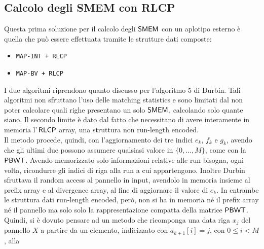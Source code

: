 \subsection{Calcolo degli SMEM con RLCP}
Questa prima soluzione per il calcolo degli $\mbox{\rm {\sf SMEM}}$ con un aplotipo esterno è
quella che può essere effettuata tramite le strutture dati composte:
\begin{itemize}
  \item \texttt{MAP-INT + RLCP}
  \item \texttt{MAP-BV + RLCP}
\end{itemize}
I due algoritmi riprendono  quanto discusso per l'algoritmo 5
di Durbin. Tali algoritmi non sfruttano l'uso delle matching statistics e sono
limitati dal non 
poter calcolare quali righe presentano un solo $\mbox{\rm {\sf SMEM}}$, calcolando solo quante
siano. Il secondo limite è dato dal fatto che necessitano di avere interamente
in memoria l'$\,\mbox{\rm {\sf RLCP}}$ array, una
struttura non run-length encoded.\\
Il metodo procede, quindi, con l'aggiornamento dei tre indici $e_k$, $f_k$ e
$g_k$, avendo che gli ultimi due possono assumere qualsiasi valore in
$\{0,\ldots, M\}$,
come con la $\mbox{\rm {\sf PBWT}}$. Avendo memorizzato solo informazioni
relative alle run bisogna, ogni volta, ricondurre gli indici di riga alla
run a cui appartengono.
Inoltre Durbin sfruttava il random access al pannello in input, avendolo in
memoria insieme al prefix array e al divergence array, al fine di aggiornare il
valore di $e_k$. In entrambe le struttura dati run-length encoded, però,
non si ha in memoria né il prefix array né il pannello ma solo solo la
rappresentazione compatta della matrice $\mbox{\rm {\sf PBWT}}$. Quindi, si è dovuto
pensare ad un metodo che ricomponga una data riga $x_j$ del pannello $X$ a
partire da un elemento, indicizzato con $a_{k+1}[i]=j$, con $0\leq i<M$, alla
